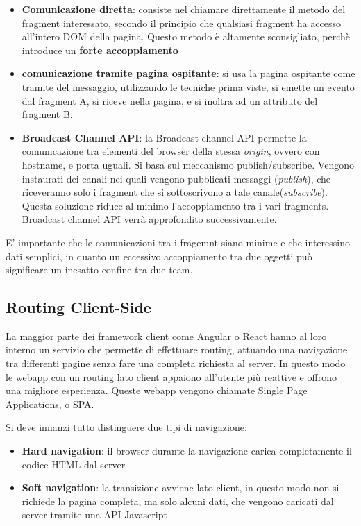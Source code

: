 \begin{itemize}
    \item \textbf{Comunicazione diretta}: consiste nel chiamare direttamente il metodo del fragment
    interessato, secondo il principio che qualsiasi fragment ha accesso all'intero DOM della pagina.
    Questo metodo è altamente sconsigliato, perchè introduce un \textbf{forte accoppiamento}
    \item \textbf{comunicazione tramite pagina ospitante}: si usa la pagina ospitante come tramite del messaggio,
    utilizzando le tecniche prima viste, si emette un evento dal fragment A, si riceve nella pagina, e si inoltra ad un attributo 
    del fragment B.
    \item \textbf{Broadcast Channel API}: la Broadcast channel API permette la comunicazione 
    tra elementi del browser della stessa \emph{origin}, ovvero con hostname, e porta uguali. 
    Si basa sul meccanismo publish/subscribe.
    Vengono instaurati dei canali nei quali vengono pubblicati messaggi (\emph{publish}), 
    che riceveranno solo i fragment che si sottoscrivono a tale canale(\emph{subscribe}).
    Questa soluzione riduce al minimo l'accoppiamento tra i vari fragments.
    Broadcast channel API verrà approfondito successivamente.
\end{itemize}

E' importante che le comunicazioni tra i fragemnt siano minime e che interessino dati semplici, in quanto
un eccessivo accoppiamento tra due oggetti può significare un inesatto confine tra due team.

\pagebreak
\subsection*{Routing Client-Side }
La maggior parte dei framework client come Angular o React hanno al loro interno un servizio che permette di
effettuare routing, attuando una navigazione tra differenti pagine senza fare una completa richiesta al server.
In questo modo le webapp con un routing lato client appaiono all'utente più reattive e offrono una migliore esperienza.
Queste webapp vengono chiamate Single Page Applications, o SPA.

Si deve innanzi tutto distinguere due tipi di navigazione:
\begin{itemize}
    \item \textbf{Hard navigation}: il browser durante la navigazione carica completamente il codice HTML dal server
    \item \textbf{Soft navigation}: la transizione avviene lato client, in questo modo non si richiede la pagina completa,
     ma solo alcuni dati, che vengono caricati dal server tramite una API Javascript
\end{itemize}

